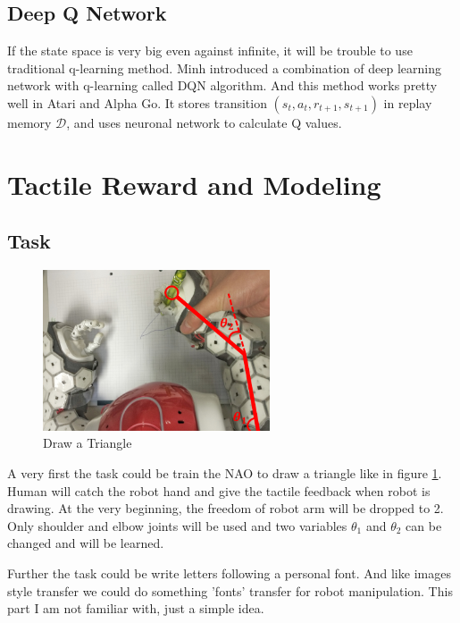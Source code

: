 \documentclass[a4paper, 11pt]{article} %
\begin{document}
\subsection{Deep Q Network}
If the state space is very big even against infinite, it will be trouble to use traditional q-learning method. Minh introduced a combination of deep learning network with q-learning called DQN algorithm.\cite{mnih2015human}
And this method works pretty well in Atari and Alpha Go. It stores transition $(s_{t},a_{t},r_{t+1},s_{t+1})$ in replay memory $\mathcal{D}$, and uses neuronal network to calculate Q values.

\section{Tactile Reward and Modeling} 

\subsection{Task}
\begin{figure} %
  \begin{center}
    \includegraphics[width=0.6\textwidth]{task.png}
  \end{center}
  \caption{Draw a Triangle}
  \label{fig:task} 
\end{figure}

A very first the task could be train the NAO to draw a triangle like in figure \ref{fig:task}. Human will catch the robot hand and give the tactile feedback when robot is drawing. At the very beginning, the freedom of robot arm will be dropped to 2. Only shoulder and elbow joints will be used and two variables $\theta_1$ and $\theta_2$ can be changed and will be learned.

Further the task could be write letters following a personal font. And like images style transfer \cite{johnson2016perceptual} we could do something 'fonts' transfer for robot manipulation. This part I am not familiar with, just a simple idea.
\end{document}

